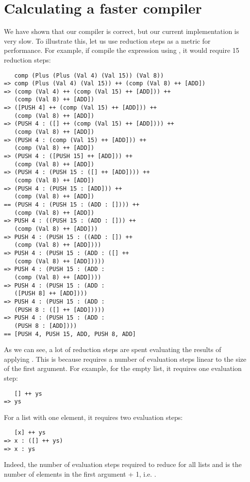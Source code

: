 \section{Calculating a faster compiler}

We have shown that our compiler  is correct, but our current implementation is very slow. To illustrate this, let us use reduction steps as a metric for performance. For example, if compile the expression  using , it would require 15 reduction steps:

\begin{verbatim}
   comp (Plus (Plus (Val 4) (Val 15)) (Val 8))
=> comp (Plus (Val 4) (Val 15)) ++ (comp (Val 8) ++ [ADD])
=> (comp (Val 4) ++ (comp (Val 15) ++ [ADD])) ++ 
   (comp (Val 8) ++ [ADD])
=> ([PUSH 4] ++ (comp (Val 15) ++ [ADD])) ++ 
   (comp (Val 8) ++ [ADD])
=> (PUSH 4 : ([] ++ (comp (Val 15) ++ [ADD]))) ++ 
   (comp (Val 8) ++ [ADD])
=> (PUSH 4 : (comp (Val 15) ++ [ADD])) ++ 
   (comp (Val 8) ++ [ADD])
=> (PUSH 4 : ([PUSH 15] ++ [ADD])) ++ 
   (comp (Val 8) ++ [ADD])
=> (PUSH 4 : (PUSH 15 : ([] ++ [ADD]))) ++ 
   (comp (Val 8) ++ [ADD])
=> (PUSH 4 : (PUSH 15 : [ADD])) ++ 
   (comp (Val 8) ++ [ADD])
== (PUSH 4 : (PUSH 15 : (ADD : []))) ++ 
   (comp (Val 8) ++ [ADD])
=> PUSH 4 : ((PUSH 15 : (ADD : [])) ++ 
   (comp (Val 8) ++ [ADD]))
=> PUSH 4 : (PUSH 15 : ((ADD : []) ++ 
   (comp (Val 8) ++ [ADD])))
=> PUSH 4 : (PUSH 15 : (ADD : ([] ++ 
   (comp (Val 8) ++ [ADD]))))
=> PUSH 4 : (PUSH 15 : (ADD : 
   (comp (Val 8) ++ [ADD])))
=> PUSH 4 : (PUSH 15 : (ADD : 
   ([PUSH 8] ++ [ADD])))
=> PUSH 4 : (PUSH 15 : (ADD : 
   (PUSH 8 : ([] ++ [ADD]))))
=> PUSH 4 : (PUSH 15 : (ADD : 
   (PUSH 8 : [ADD])))  
== [PUSH 4, PUSH 15, ADD, PUSH 8, ADD] 
\end{verbatim}
As we can see, a lot of reduction steps are spent evaluating the results of applying \haskellIn{(++)}. This is because \haskellIn{(++)} requires a number of evaluation steps linear to the size of the first argument. For example, for the empty list, it requires one evaluation step:
\begin{verbatim}
   [] ++ ys 
=> ys
\end{verbatim}
For a list with one element, it requires two evaluation steps:
\begin{verbatim}
   [x] ++ ys 
=> x : ([] ++ ys)
=> x : ys
\end{verbatim}
Indeed, the number of evaluation steps required to reduce  for all lists  and  is the number of elements in the first argument + 1, i.e. . 

